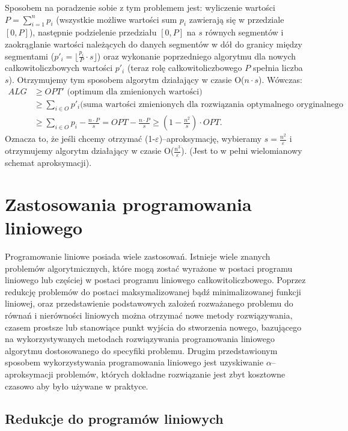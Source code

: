 \documentclass[licencjacka]{pracamgr}
\begin{document}
Sposobem na poradzenie sobie z tym problemem jest: wyliczenie wartości $P=\sum\limits_{i=1}^{n}p_i$ (wszystkie możliwe wartości sum $p_i$ zawierają się w przedziale $[0,P]$),
następnie podzielenie przedziału $[0,P]$ na $s$ równych segmentów i zaokrąglanie wartości należących do danych segmentów w dół do granicy między segmentami
($p'_i=\lfloor\frac{p_i}{P}\cdot s\rfloor$) oraz wykonanie poprzedniego algorytmu dla nowych całkowitoliczbowych wartości $p'_i$ (teraz rolę całkowitoliczbowego $P$ spełnia liczba $s$).
Otrzymujemy tym sposobem algorytm działający w czasie O($n\cdot s$).\newline
Wówczas:
\begin{align*}
ALG & \ge OPT'\text{ (optimum dla zmienionych wartości) } \\
& \ge\sum\limits_{i\in O}p'_i\text{(suma wartości zmienionych dla rozwiązania optymalnego oryginalnego zadania)}\\
& \ge \sum\limits_{i\in O}p_i-\frac{n\cdot P}{s}=OPT-\frac{n\cdot P}{s}\ge \left(1-\frac{n^2}{s}\right)\cdot OPT.
\end{align*}
Oznacza to, że jeśli chcemy otrzymać (1-$\varepsilon$)--aproksymację, wybieramy $s=\frac{n^2}{\varepsilon}$ i otrzymujemy algorytm działający w czasie O($\frac{n^3}{\varepsilon}$).
(Jest to w pełni wielomianowy schemat aproksymacji).
%
  \chapter{Zastosowania programowania liniowego}\label{r:zast}
Programowanie liniowe posiada wiele zastosowań. Istnieje wiele znanych problemów algorytmicznych, które mogą zostać wyrażone w postaci programu liniowego lub
częściej w postaci programu liniowego całkowitoliczbowego. Poprzez redukcję problemów do postaci maksymalizowanej bądź minimalizowanej funkcji liniowej, oraz przedstawienie
podstawowych założeń rozważanego problemu do równań i nierówności liniowych można otrzymać nowe metody rozwiązywania, czasem prostsze lub stanowiące punkt wyjścia do stworzenia
nowego, bazującego na wykorzystywanych metodach rozwiązywania programowania liniowego algorytmu dostosowanego do specyfiki problemu.
Drugim przedstawionym sposobem wykorzystywania programowania liniowego jest uzyskiwanie $\alpha$--aproksymacji problemów, których dokładne rozwiązanie jest zbyt kosztowne czasowo
aby było używane w praktyce.\newline
%
   \section{Redukcje do programów liniowych}
\end{document}
